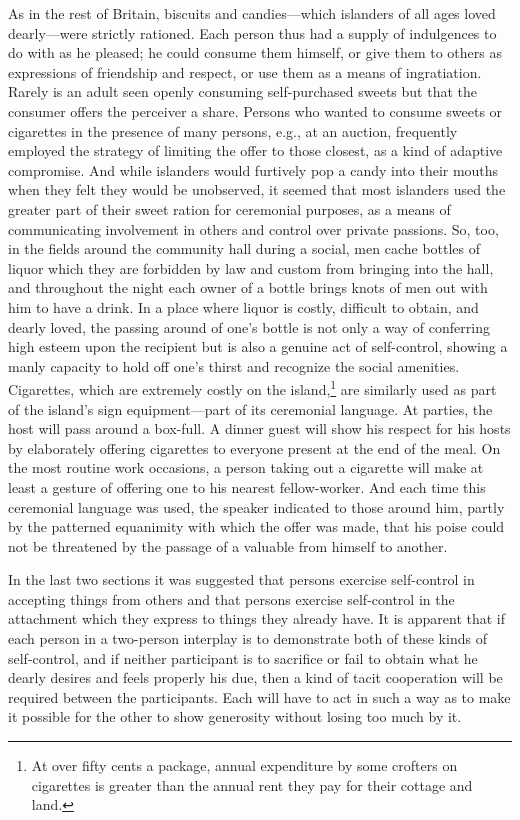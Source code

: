 \documentclass[openany,nobib]{tufte-book}
\begin{document}
As in the rest of Britain, biscuits and candies---which islanders of all
ages loved dearly---were strictly rationed. Each person thus had a
supply of indulgences to do with as he pleased; he could consume them
himself, or give them to others as expressions of friendship and
respect, or use them as a means of ingratiation. Rarely is an adult seen
openly consuming self-purchased sweets but that the consumer offers the
perceiver a share. Persons who wanted to consume sweets or cigarettes in
the presence of many persons, e.g., at an auction, frequently employed
the strategy of limiting the offer to those closest, as a kind of
adaptive compromise. And while islanders would furtively pop a candy
into their mouths when they felt they would be unobserved, it seemed
that most islanders used the greater part of their sweet ration for
ceremonial purposes, as a means of communicating involvement in others
and control over private passions. So, too, in the fields around the
community hall during a social, men cache bottles of liquor which they
are forbidden by law and custom from bringing into the hall, and
throughout the night each owner of a bottle brings knots of men out with
him to have a drink. In a place where liquor is costly, difficult to
obtain, and dearly loved, the passing around of one's bottle is not only
a way of conferring high esteem upon the recipient but is also a genuine
act of self-control, showing a manly capacity to hold off one's thirst
and recognize the social amenities. Cigarettes, which are extremely
costly on the island,\footnote{At over fifty cents a package, annual
  expenditure by some crofters on cigarettes is greater than the annual
  rent they pay for their cottage and land.} are similarly used as part
of the island's sign equipment---part of its ceremonial language. At
parties, the host will pass around a box-full. A dinner guest will show
his respect for his hosts by elaborately offering cigarettes to everyone
present at the end of the meal. On the most routine work occasions, a
person taking out a cigarette will make at least a gesture of offering
one to his nearest fellow-worker. And each time this ceremonial language
was used, the speaker indicated to those around him, partly by the
patterned equanimity with which the offer was made, that his poise could
not be threatened by the passage of a valuable from himself to another.

In the last two sections it was suggested that persons exercise
self-control in accepting things from others and that persons exercise
self-control in the attachment which they express to things they already
have. It is apparent that if each person in a two-person interplay is to
demonstrate both of these kinds of self-control, and if neither
participant is to sacrifice or fail to obtain what he dearly desires and
feels properly his due, then a kind of tacit cooperation will be
required between the participants. Each will have to act in such a way
as to make it possible for the other to show generosity without losing
too much by it.
\end{document}
